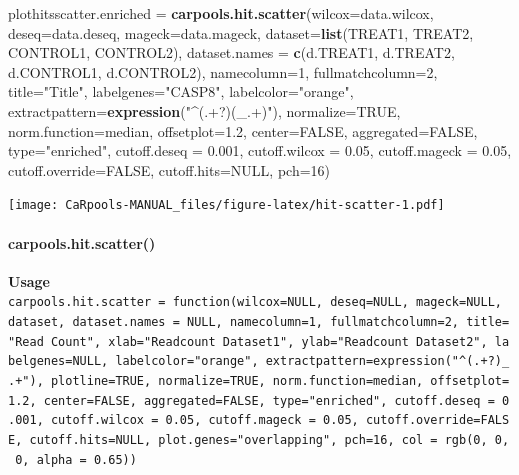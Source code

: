 \documentclass[]{article}
\newenvironment{Shaded}{\begin{snugshade}}{\end{snugshade}}
\newcommand{\KeywordTok}[1]{\textcolor[rgb]{0.13,0.29,0.53}{\textbf{{#1}}}}
\newcommand{\DataTypeTok}[1]{\textcolor[rgb]{0.13,0.29,0.53}{{#1}}}
\newcommand{\DecValTok}[1]{\textcolor[rgb]{0.00,0.00,0.81}{{#1}}}
\newcommand{\FloatTok}[1]{\textcolor[rgb]{0.00,0.00,0.81}{{#1}}}
\newcommand{\StringTok}[1]{\textcolor[rgb]{0.31,0.60,0.02}{{#1}}}
\newcommand{\OtherTok}[1]{\textcolor[rgb]{0.56,0.35,0.01}{{#1}}}
\newcommand{\NormalTok}[1]{{#1}}
\let\oldparagraph\paragraph
\renewcommand{\paragraph}[1]{\oldparagraph{#1}\mbox{}}
\begin{document}
\begin{Shaded}
\begin{Highlighting}[]
\NormalTok{plothitsscatter.enriched =}\StringTok{ }\KeywordTok{carpools.hit.scatter}\NormalTok{(}\DataTypeTok{wilcox=}\NormalTok{data.wilcox, }\DataTypeTok{deseq=}\NormalTok{data.deseq, }\DataTypeTok{mageck=}\NormalTok{data.mageck, }\DataTypeTok{dataset=}\KeywordTok{list}\NormalTok{(TREAT1, TREAT2, CONTROL1, CONTROL2), }\DataTypeTok{dataset.names =} \KeywordTok{c}\NormalTok{(d.TREAT1, d.TREAT2, d.CONTROL1, d.CONTROL2), }\DataTypeTok{namecolumn=}\DecValTok{1}\NormalTok{, }\DataTypeTok{fullmatchcolumn=}\DecValTok{2}\NormalTok{, }\DataTypeTok{title=}\StringTok{"Title"}\NormalTok{, }\DataTypeTok{labelgenes=}\StringTok{"CASP8"}\NormalTok{, }\DataTypeTok{labelcolor=}\StringTok{"orange"}\NormalTok{, }\DataTypeTok{extractpattern=}\KeywordTok{expression}\NormalTok{(}\StringTok{"^(.+?)(_.+)"}\NormalTok{), }\DataTypeTok{normalize=}\OtherTok{TRUE}\NormalTok{, }\DataTypeTok{norm.function=}\NormalTok{median, }\DataTypeTok{offsetplot=}\FloatTok{1.2}\NormalTok{, }\DataTypeTok{center=}\OtherTok{FALSE}\NormalTok{, }\DataTypeTok{aggregated=}\OtherTok{FALSE}\NormalTok{, }\DataTypeTok{type=}\StringTok{"enriched"}\NormalTok{, }\DataTypeTok{cutoff.deseq =} \FloatTok{0.001}\NormalTok{, }\DataTypeTok{cutoff.wilcox =} \FloatTok{0.05}\NormalTok{, }\DataTypeTok{cutoff.mageck =} \FloatTok{0.05}\NormalTok{, }\DataTypeTok{cutoff.override=}\OtherTok{FALSE}\NormalTok{, }\DataTypeTok{cutoff.hits=}\OtherTok{NULL}\NormalTok{,  }\DataTypeTok{pch=}\DecValTok{16}\NormalTok{)}
\end{Highlighting}
\end{Shaded}

\texttt{[image: CaRpools-MANUAL\_files/figure-latex/hit-scatter-1.pdf]}

\paragraph{carpools.hit.scatter()}\label{carpools.hit.scatter}

\textbf{Usage}\\
\texttt{carpools.hit.scatter\ =\ function(wilcox=NULL,\ deseq=NULL,\ mageck=NULL,\ dataset,\ dataset.names\ =\ NULL,\ namecolumn=1,\ fullmatchcolumn=2,\ title="Read\ Count",\ xlab="Readcount\ Dataset1",\ ylab="Readcount\ Dataset2",\ labelgenes=NULL,\ labelcolor="orange",\ extractpattern=expression("\^{}(.+?)\_.+"),\ plotline=TRUE,\ normalize=TRUE,\ norm.function=median,\ offsetplot=1.2,\ center=FALSE,\ aggregated=FALSE,\ type="enriched",\ cutoff.deseq\ =\ 0.001,\ cutoff.wilcox\ =\ 0.05,\ cutoff.mageck\ =\ 0.05,\ cutoff.override=FALSE,\ cutoff.hits=NULL,\ plot.genes="overlapping",\ pch=16,\ col\ =\ rgb(0,\ 0,\ 0,\ alpha\ =\ 0.65))}
\end{document}
